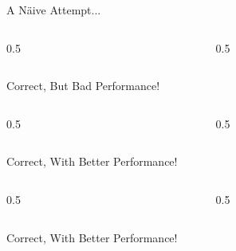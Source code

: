 \documentclass[10pt]{beamer}
\begin{document}
\begin{frame}{A N\"{a}ive Attempt...}

\begin{columns}[c]
  \begin{column}{0.5\textwidth}
    
  \end{column}
  \begin{column}{0.5\textwidth}
    
  \end{column}
\end{columns}

\end{frame}

\begin{frame}{Correct, But Bad Performance!}

\begin{columns}[c]
  \begin{column}{0.5\textwidth}
    
  \end{column}
  \begin{column}{0.5\textwidth}
    
  \end{column}
\end{columns}

\end{frame}

\begin{frame}{Correct, With Better Performance!}


\begin{columns}[c]
  \begin{column}{0.5\textwidth}
    
  \end{column}
  \begin{column}{0.5\textwidth}
    
  \end{column}
\end{columns}

\end{frame}

\begin{frame}{Correct, With Better Performance!}





\end{frame}
\end{document}
